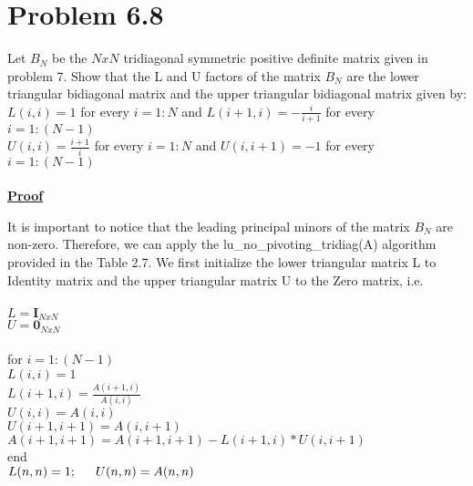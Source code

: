 \documentclass{article}
\DeclareMathOperator{\1}{\mathit{1}}
\numberwithin{figure}{section} %
\numberwithin{table}{section}
\begin{document}
\newpage{}
\section {Problem 6.8} 
\par Let \(B_N\) be the \(NxN\) tridiagonal symmetric positive definite matrix given in problem 7. Show that the L and U factors of the matrix  \(B_N\) are the lower triangular bidiagonal matrix and the upper triangular bidiagonal matrix given by:\\
\indent \(L(i,i) = 1\) for every \(i=1:N\) and \(L(i+1,i) = -\frac{i}{i+1}\) for every \(i=1:(N-1)\)\\ 
\indent\(U(i,i) = \frac{i+1}{i}\) for every \(i=1:N\) and \(U(i,i+1) = -1\) for every \(i=1:(N-1)\)\\\\
\underline{\textbf {Proof}} 
\par It is important to notice that the leading principal minors of the matrix \(B_N\) are non-zero. Therefore, we can apply the lu\_no\_pivoting\_tridiag(A) algorithm provided in the Table 2.7. We first initialize the lower triangular matrix L to Identity matrix and the upper triangular matrix U to the Zero matrix, i.e.\\\\
\indent \hspace{5 cm} \(L=\textbf{I}_{NxN}\)\\
\indent \hspace{5 cm} \(U=\textbf{0}_{NxN}\)\\\\
\indent \hspace{5 cm}for \(i=1:(N-1)\)\\
\indent \hspace{5 cm} \indent \(L(i,i) = 1\)\\
\indent \hspace{5 cm} \indent \(L(i+1,i) = \frac{A(i+1,i)}{A(i,i)}\)\\
\indent \hspace{5 cm} \indent \(U(i,i) = A(i,i)\)\\
\indent \hspace{5 cm} \indent \(U(i+1,i+1) = A(i,i+1)\)\\
\indent \hspace{5 cm} \indent \(A(i+1,i+1) = A(i+1,i+1)-L(i+1,i)*U(i,i+1)\)\\
\indent \hspace{5 cm} end\\
\indent \hspace{5 cm} \(L(n,n) = 1; \indent U(n,n) = A(n,n)\)\\\\
\end{document}
